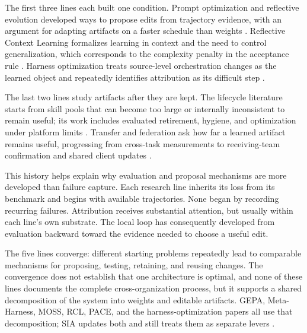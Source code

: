 \documentclass[
  11pt,
]{article}
\newcounter{none} %
\begin{document}
The first three lines each built one condition. Prompt optimization and reflective evolution developed ways to propose edits from trajectory evidence, with an argument for adapting artifacts on a faster schedule than weights \cite{agrawal2025gepa, tiwari2026fastandslow}. Reflective Context Learning formalizes learning in context and the need to control generalization, which corresponds to the complexity penalty in the acceptance rule \cite{vassilyev2026rcl}. Harness optimization treats source-level orchestration changes as the learned object and repeatedly identifies attribution as its difficult step \cite{lee2026metaharness, lin2026ahe, cai2026moss, zehle2026cantante, nguyen2026harnessevo, chen2026harnessforge, li2026growingharness}.

The last two lines study artifacts after they are kept. The lifecycle literature starts from skill pools that can become too large or internally inconsistent to remain useful; its work includes evaluated retirement, hygiene, and optimization under platform limits \cite{zhang2026ratchet, tanjim2026mocha, liu2026skillsvote, zhang2026librarydrift, wei2026skillsmith, pu2026skillops, wang2026assay}. Transfer and federation ask how far a learned artifact remains useful, progressing from cross-task measurements to receiving-team confirmation and shared client updates \cite{shalev2026ict, li2026combee, qu2026coral, ling2026pace, wang2026evo2team, yang2026federatedskill, nie2026evolvenet}.

This history helps explain why evaluation and proposal mechanisms are more developed than failure capture. Each research line inherits its loss from its benchmark and begins with available trajectories. None began by recording recurring failures. Attribution receives substantial attention, but usually within each line's own substrate. The local loop has consequently developed from evaluation backward toward the evidence needed to choose a useful edit.

The five lines converge: different starting problems repeatedly lead to comparable mechanisms for proposing, testing, retaining, and reusing changes. The convergence does not establish that one architecture is optimal, and none of these lines documents the complete cross-organization process, but it supports a shared decomposition of the system into weights and editable artifacts. GEPA, Meta-Harness, MOSS, RCL, PACE, and the harness-optimization papers all use that decomposition; SIA updates both and still treats them as separate levers \cite{hebbar2026sia}.
\end{document}

